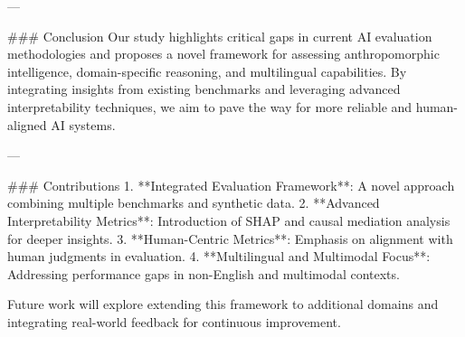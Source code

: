 ---

### Conclusion
Our study highlights critical gaps in current AI evaluation methodologies and proposes a novel framework for assessing anthropomorphic intelligence, domain-specific reasoning, and multilingual capabilities. By integrating insights from existing benchmarks and leveraging advanced interpretability techniques, we aim to pave the way for more reliable and human-aligned AI systems.

---

### Contributions
1. **Integrated Evaluation Framework**: A novel approach combining multiple benchmarks and synthetic data.
2. **Advanced Interpretability Metrics**: Introduction of SHAP and causal mediation analysis for deeper insights.
3. **Human-Centric Metrics**: Emphasis on alignment with human judgments in evaluation.
4. **Multilingual and Multimodal Focus**: Addressing performance gaps in non-English and multimodal contexts. 

Future work will explore extending this framework to additional domains and integrating real-world feedback for continuous improvement.
